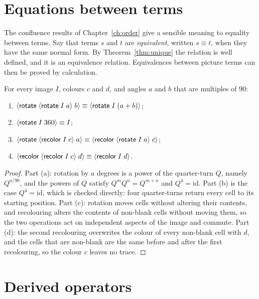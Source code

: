 \section{Equations between terms}

The confluence results of Chapter~\ref{ch:order} give a sensible meaning to equality between terms. Say that terms $s$ and $t$ are \emph{equivalent}, written $s\equiv t$, when they have the same normal form. By Theorem~\ref{thm:unique} the relation is well defined, and it is an equivalence relation. Equivalences between picture terms can then be proved by calculation.

\begin{proposition}\label{prop:image-laws}
For every image $I$, colours $c$ and $d$, and angles $a$ and $b$ that are multiples of $90$:
\begin{enumerate}[label=(\alph*)]
\item $\langle \mathsf{rotate}\; \langle \mathsf{rotate}\; I\; a\rangle\; b\rangle\equiv\langle \mathsf{rotate}\; I\; (a+b)\rangle$;
\item $\langle \mathsf{rotate}\; I\; 360\rangle\equiv I$;
\item $\langle \mathsf{rotate}\; \langle \mathsf{recolor}\; I\; c\rangle\; a\rangle\equiv\langle \mathsf{recolor}\; \langle \mathsf{rotate}\; I\; a\rangle\; c\rangle$;
\item $\langle \mathsf{recolor}\; \langle \mathsf{recolor}\; I\; c\rangle\; d\rangle\equiv\langle \mathsf{recolor}\; I\; d\rangle$.
\end{enumerate}
\end{proposition}
\begin{proof}
Part (a): rotation by $a$ degrees is a power of the quarter-turn $Q$, namely $Q^{a/90}$, and the powers of $Q$ satisfy $Q^m Q^n=Q^{m+n}$ and $Q^4=\mathrm{id}$. Part (b) is the case $Q^4=\mathrm{id}$, which is checked directly: four quarter-turns return every cell to its starting position. Part (c): rotation moves cells without altering their contents, and recolouring alters the contents of non-blank cells without moving them, so the two operations act on independent aspects of the image and commute. Part (d): the second recolouring overwrites the colour of every non-blank cell with $d$, and the cells that are non-blank are the same before and after the first recolouring, so the colour $c$ leaves no trace.
\end{proof}

\section{Derived operators}

